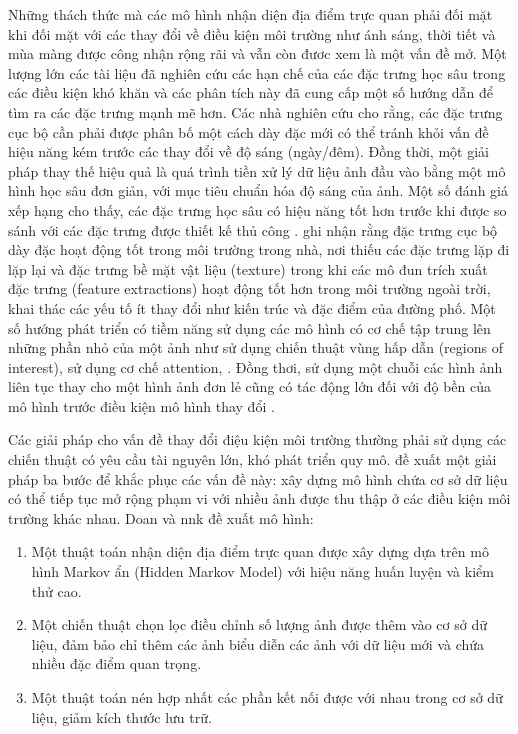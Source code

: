 Những thách thức mà các mô hình nhận diện địa điểm trực quan phải đối mặt khi đối mặt với các thay đổi về điều kiện môi trường như ánh sáng, thời tiết và mùa màng được công nhận rộng rãi \cite{zaffar2019levelling} và vẫn còn đươc xem là một vấn đề mở. Một lượng lớn các tài liệu đã nghiên cứu các hạn chế của các đặc trưng học sâu trong các điều kiện khó khăn \cite{zhou2016evaluating, sunderhauf2015performance, chen2017deep} và các phân tích này đã cung cấp một số hướng dẫn để tìm ra các đặc trưng mạnh mẽ hơn. Các nhà nghiên cứu cho rằng, các đặc trưng cục bộ cần phải được phân bố một cách dày đặc mới có thể tránh khỏi vấn đề hiệu năng kém trước các thay đổi về độ sáng (ngày/đêm). Đồng thời, một giải pháp thay thế hiệu quả là quá trình tiền xử lý dữ liệu ảnh đầu vào bằng một mô hình học sâu đơn giản, với mục tiêu chuẩn hóa độ sáng của ảnh. Một số đánh giá xếp hạng cho thấy, các đặc trưng học sâu có hiệu năng tốt hơn trước khi được so sánh với các đặc trưng được thiết kế thủ công \cite{arandjelovic2017netvlad}. \cite{taira2018inloc} ghi nhận rằng đặc trưng cục bộ dày đặc hoạt động tốt trong môi trường trong nhà, nơi thiếu các đặc trưng lặp đi lặp lại và đặc trưng bề mặt vật liệu (texture) trong khi các mô đun trích xuất đặc trưng (feature extractions) hoạt động tốt hơn trong môi trường ngoài trời, khai thác các yếu tố ít thay đổi như kiến trúc và đặc điểm của đường phố. Một số hướng phát triển có tiềm năng sử dụng các mô hình có cơ chế tập trung lên những phần nhỏ của một ảnh như \cite{sunderhauf2015place, chen2017only, khaliq2019holistic} sử dụng chiến thuật vùng hấp dẫn (regions of interest), \cite{zhu2018attention, chen2017only, khaliq2019holistic, wang2019atloc, wang2022transvpr, alibey2023mixvpr} sử dụng cơ chế attention, \cite{garg2018lost, naseer2017semantics, seymour2019semantically}. Đồng thơi, sử dụng một chuỗi các hình ảnh liên tục thay cho một hình ảnh đơn lẻ cũng có tác động lớn đối với độ bền của mô hình trước điều kiện mô hình thay đổi \cite{naseer2018robust, hausler2019multi, hong2019textplace, chancan2020hybrid}.

Các giải pháp cho vấn đề thay đổi điệu kiện môi trường thường phải sử dụng các chiến thuật có yêu cầu tài nguyên lớn, khó phát triển quy mô. \cite{doan2019scalable} đề xuất một giải pháp ba bước để khắc phục các vấn đề này: xây dựng mô hình chứa cơ sở dữ liệu có thể tiếp tục mở rộng phạm vi với nhiều ảnh được thu thập ở các điều kiện môi trường khác nhau. Doan và nnk đề xuất mô hình:

\begin{enumerate}
    \item Một thuật toán nhận diện địa điểm trực quan được xây dựng dựa trên mô hình Markov ẩn (Hidden Markov Model) với hiệu năng huấn luyện và kiểm thử cao.
    \item Một chiến thuật chọn lọc điều chỉnh số lượng ảnh được thêm vào cơ sở dữ liệu, đảm bảo chỉ thêm các ảnh biểu diễn các ảnh với dữ liệu mới và chứa nhiều đặc điểm quan trọng.
    \item Một thuật toán nén hợp nhất các phần kết nối được với nhau trong cơ sở dữ liệu, giảm kích thước lưu trữ.
\end{enumerate}

